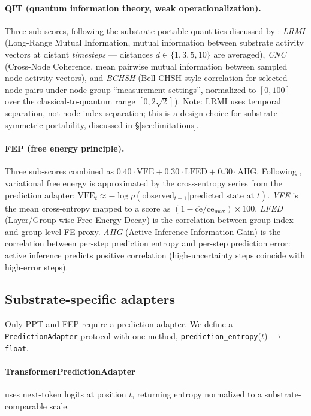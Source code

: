 \documentclass[11pt,a4paper]{article}
\begin{document}
\paragraph{QIT (quantum information theory, weak operationalization).} Three sub-scores, following the substrate-portable quantities discussed by \citet{tegmark2014consciousness}: \emph{LRMI} (Long-Range Mutual Information, mutual information between substrate activity vectors at distant \emph{timesteps} --- distances $d \in \{1, 3, 5, 10\}$ are averaged), \emph{CNC} (Cross-Node Coherence, mean pairwise mutual information between sampled node activity vectors), and \emph{BCHSH} (Bell-CHSH-style correlation for selected node pairs under node-group ``measurement settings'', normalized to $[0, 100]$ over the classical-to-quantum range $[0, 2\sqrt{2}]$). Note: LRMI uses temporal separation, not node-index separation; this is a design choice for substrate-symmetric portability, discussed in \S\ref{sec:limitations}.

\paragraph{FEP (free energy principle).} Three sub-scores combined as $0.40 \cdot \text{VFE} + 0.30 \cdot \text{LFED} + 0.30 \cdot \text{AIIG}$. Following \citet{friston2010free}, variational free energy is approximated by the cross-entropy series from the prediction adapter: $\text{VFE}_t \approx -\log p(\text{observed}_{t+1} | \text{predicted state at } t)$. \emph{VFE} is the mean cross-entropy mapped to a score as $(1 - \overline{\text{ce}}/\text{ce}_{\max}) \times 100$. \emph{LFED} (Layer/Group-wise Free Energy Decay) is the correlation between group-index and group-level FE proxy. \emph{AIIG} (Active-Inference Information Gain) is the correlation between per-step prediction entropy and per-step prediction error: active inference predicts positive correlation (high-uncertainty steps coincide with high-error steps).

\subsection{Substrate-specific adapters}
\label{sec:adapters}

Only PPT and FEP require a prediction adapter. We define a \texttt{PredictionAdapter} protocol with one method, \texttt{prediction\_entropy}($t$) $\rightarrow$ \texttt{float}.

\paragraph{TransformerPredictionAdapter} uses next-token logits at position $t$, returning entropy normalized to a substrate-comparable scale.
\end{document}
